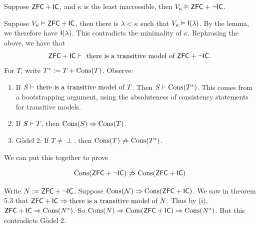 \documentclass{article}
\begin{document}
\endproof 
\begin{fancythm}{}
    Suppose $\mathsf{ZFC} + \mathsf{IC}$, and $\kappa$ is the least inaccessible, then $V_{\kappa} \vDash \mathsf{ZFC} + \neg \mathsf{IC}$.
\end{fancythm}
\proof Suppose $V_{\kappa} \vDash \mathsf{ZFC}+\mathsf{IC}$, then there is $\lambda < \kappa$ such that $V_{\kappa} \vDash \mathsf{I}(\lambda)$. By the lemma, we therefore have $\mathsf{I}(\lambda)$. This contradicts the minimality of $\kappa$. \endproof 
Rephrasing the above, we have that \[\mathsf{ZFC} + \mathsf{IC} \vdash \text{ there is a transitive model of $\mathsf{ZFC} + \neg \mathsf{IC}$}.\]
For $T$, write $T^{*} := T + \operatorname{Cons}(T)$. Observe: \begin{enumerate}
    \item[(i)] If $S \vdash \text{there is a transitive model of $T$}$. Then $S \vdash \operatorname{Cons}(T^{*})$. This comes from a bootstrapping argument, using the absoluteness of consistency statements for transitive models.
    \item[(ii)] If $S \vdash T$, then $\operatorname{Cons}(S) \Rightarrow \operatorname{Cons}(T)$.
    \item[(iii)] G\"odel 2: If $T \neq \perp$, then $\operatorname{Cons}(T) \not\Rightarrow \operatorname{Cons}(T^{*})$. 
\end{enumerate}
We can put this together to prove \begin{fancyprop}{}
    \[\operatorname{Cons}(\mathsf{ZFC} + \neg \mathsf{IC}) \not\Rightarrow \operatorname{Cons}(\mathsf{ZFC} + \mathsf{IC})\]
\end{fancyprop}
\proof Write $N := \mathsf{ZFC} + \neg \mathsf{IC}$. Suppose $\operatorname{Cons}(\mathcal{N}) \Rightarrow \operatorname{Cons}(\mathsf{ZFC} + \mathsf{IC})$. We saw in theorem 5.3 that $\mathsf{ZFC} + \mathsf{IC} \Rightarrow \text{there is a transitive model of $N$}.$ Thus by (i), $\mathsf{ZFC}+\mathsf{IC} \Rightarrow \operatorname{Cons}(N^{*})$. So $\operatorname{Cons}(N) \Rightarrow \operatorname{Cons}(\mathsf{ZFC} + \mathsf{IC}) \Rightarrow \operatorname{Cons}(N^{*})$. But this contradicts G\"odel 2. \endproof 
\end{document}
